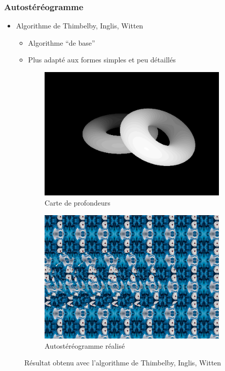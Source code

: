 \documentclass{beamer}
\begin{document}
\begin{frame}
\frametitle{Autostéréogramme}
\begin{itemize}[label=$\bullet$]
\item Algorithme de Thimbelby, Inglis, Witten \cite{stereogram}
	\begin{itemize}[label=$\circ$]
	\item Algorithme ``de base''
	\item Plus adapté aux formes simples et peu détaillés
	\end{itemize}
\end{itemize}
\begin{figure}
\centering
\begin{subfigure}{.4\textwidth}
  \centering
  \includegraphics[width=1\linewidth]{donutdepth.png}
  \caption{Carte de profondeurs}
\end{subfigure}
\begin{subfigure}{.4\textwidth}
  \centering
  \includegraphics[width=1\linewidth]{donut1.png}
  \caption{Autostéréogramme réalisé}
\end{subfigure}
\caption{Résultat obtenu avec l'algorithme de Thimbelby, Inglis, Witten}
\end{figure}


\end{frame}
\end{document}
